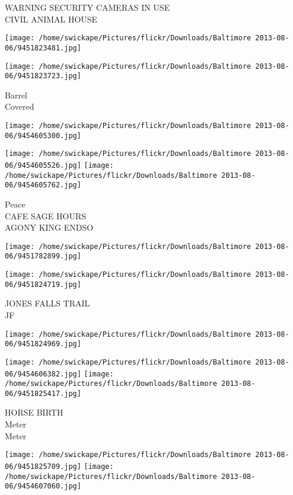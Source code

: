 \documentclass[10pt,letterpaper]{article}
\begin{document}
WARNING SECURITY CAMERAS IN USE\\
CIVIL ANIMAL HOUSE
\pagebreak

\texttt{[image: /home/swickape/Pictures/flickr/Downloads/Baltimore 2013-08-06/9451823481.jpg]}

\vspace{0.25in}
\texttt{[image: /home/swickape/Pictures/flickr/Downloads/Baltimore 2013-08-06/9451823723.jpg]}

Barrel\\
Covered
\pagebreak

\texttt{[image: /home/swickape/Pictures/flickr/Downloads/Baltimore 2013-08-06/9454605300.jpg]}

\vspace{0.25in}
\texttt{[image: /home/swickape/Pictures/flickr/Downloads/Baltimore 2013-08-06/9454605526.jpg]}
\texttt{[image: /home/swickape/Pictures/flickr/Downloads/Baltimore 2013-08-06/9454605762.jpg]}

Peace\\
CAFE SAGE HOURS\\
AGONY KING ENDSO
\pagebreak

\texttt{[image: /home/swickape/Pictures/flickr/Downloads/Baltimore 2013-08-06/9451782899.jpg]}

\vspace{0.25in}
\texttt{[image: /home/swickape/Pictures/flickr/Downloads/Baltimore 2013-08-06/9451824719.jpg]}

JONES FALLS TRAIL\\
JF
\pagebreak

\texttt{[image: /home/swickape/Pictures/flickr/Downloads/Baltimore 2013-08-06/9451824969.jpg]}

\vspace{0.25in}
\texttt{[image: /home/swickape/Pictures/flickr/Downloads/Baltimore 2013-08-06/9454606382.jpg]}
\texttt{[image: /home/swickape/Pictures/flickr/Downloads/Baltimore 2013-08-06/9451825417.jpg]}

HORSE BIRTH\\
Meter\\
Meter
\pagebreak

\texttt{[image: /home/swickape/Pictures/flickr/Downloads/Baltimore 2013-08-06/9451825709.jpg]}
\texttt{[image: /home/swickape/Pictures/flickr/Downloads/Baltimore 2013-08-06/9454607060.jpg]}
\end{document}
